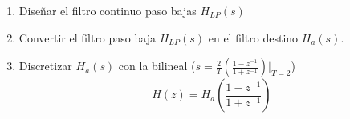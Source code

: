 \documentclass[handout]{beamer}
\numberwithin{section}{part}
\begin{document}
\begin{frame}
\begin{enumerate}
\begin{columns}[T]
\begin{column}{3cm}
    $\hat \omega_0^2=\hat \omega_{p1}\hat \omega_{p2}=\hat \omega_{s1}\hat \omega_{s2}$

    \end{column}
  \end{columns}

  \item Diseñar el filtro continuo paso bajas $H_{LP}(s)$
  
  \item Convertir el filtro paso baja $H_{LP}(s)$ en el filtro destino $H_a(s)$.

  \item Discretizar $H_a(s)$ con la bilineal ($s=\frac{2}{T}\left ( \frac{1-z^{-1}}{1+z^{-1}}\right)|_{T=2}$)
  \[
    H(z) = H_a\left(\frac{1-z^{-1}}{1+z^{-1}}\right)
  \]

  \end{enumerate}
\end{frame}
\end{document}
